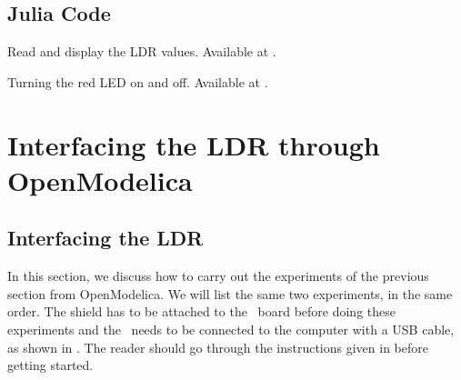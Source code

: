 \subsection{Julia Code}
\label{sec:ldr-julia-code}

\begin{juliacode}
{Read and display the LDR values.  Available at
  .}
\label{julia:ldr-read}

\end{juliacode}

\begin{juliacode}
{Turning the red LED on and off.  Available at
  .}
\label{julia:ldr-led}

\end{juliacode}

\section{Interfacing the LDR through OpenModelica}
\subsection{Interfacing the LDR}
In this section, we discuss how to carry out the experiments of the
previous section from OpenModelica.  We will list the same two experiments,
in the same order.  The shield has to be attached to the \arduino\ board
before doing these experiments and the \arduino\ needs to be connected to the computer 
with a USB cable, as shown in .
The reader should go through the instructions given in
 before getting started.

